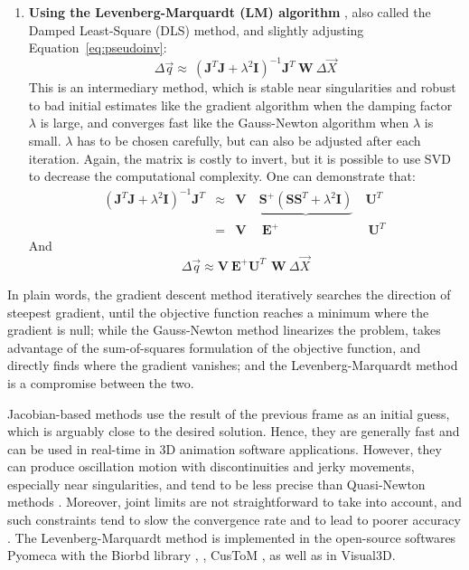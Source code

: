 \begin{enumerate}[itemsep=0em, topsep=0em, leftmargin=*]
    \item \textbf{Using the Levenberg-Marquardt (LM) algorithm} \cite{More1978}, also called the Damped Least-Square (DLS) method, and slightly adjusting Equation~\ref{eq:pseudoinv}:
    \begin{equation}
        \Delta \overrightarrow{q} 
        \approx \ (\textbf{J}^T \textbf{J} + \lambda^2 \textbf{I})^{-1} \textbf{J}^T \ \textbf{W} \ \Delta\overrightarrow{X}
    \end{equation} 
    This is an intermediary method, which is stable near singularities and robust to bad initial estimates like the gradient algorithm when the damping factor $\lambda$ is large, and converges fast like the Gauss-Newton algorithm when $\lambda$ is small. $\lambda$ has to be chosen carefully, but can also be adjusted after each iteration. Again, the matrix is costly to invert, but it is possible to use SVD to decrease the computational complexity. One can demonstrate that:
     \begin{equation}
        \begin{array}{rlccccc} 
            (\textbf{J}^T \textbf{J} + \lambda^2 \textbf{I})^{-1} \textbf{J}^T 
            &\approx& \textbf{V} \ & \underbrace{\textbf{S}^{+} (\textbf{S} \textbf{S}^T+\lambda^2 \textbf{I})} \  & \textbf{U}^T \ \ \\
            & = & \textbf{V} & \ \textbf{E}^{+} & \  \textbf{U}^T
        \end{array}
     \end{equation}
    And 
      \begin{equation}
        \Delta \overrightarrow{q} \approx  \textbf{V} \ \textbf{E}^{+} \textbf{U}^T \ \ \textbf{W} \ \Delta\overrightarrow{X}
      \end{equation}
\end{enumerate}

In plain words, the gradient descent method iteratively searches the direction of steepest gradient, until the objective function reaches a minimum where the gradient is null; while the Gauss-Newton method linearizes the problem, takes advantage of the sum-of-squares formulation of the objective function, and directly finds where the gradient vanishes; and the Levenberg-Marquardt method is a compromise between the two.

Jacobian-based methods use the result of the previous frame as an initial guess, which is arguably close to the desired solution. Hence, they are generally fast and can be used in real-time in 3D animation software applications. However, they can produce oscillation motion with discontinuities and jerky movements, especially near singularities, and tend to be less precise than Quasi-Newton methods \cite{Aristidou2018}. Moreover, joint limits are not straightforward to take into account, and such constraints tend to slow the convergence rate and to lead to poorer accuracy \cite{Aristidou2018}. The Levenberg-Marquardt method is implemented in the open-source softwares Pyomeca \cite{Martinez2020} with the Biorbd library \cite{Michaud2021}, \cite{Pinocchio,Carpentier2019}, CusToM \cite{Muller2019}, as well as in Visual3D. 



